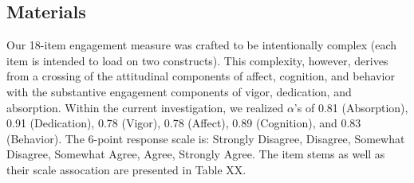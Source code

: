 \documentclass[
  english,
  man]{apa6}
\begin{document}
\hypertarget{materials}{%
\subsection{Materials}\label{materials}}

Our 18-item engagement measure was crafted to be intentionally complex (each item is intended to load on two constructs). This complexity, however, derives from a crossing of the attitudinal components of affect, cognition, and behavior with the substantive engagement components of vigor, dedication, and absorption. Within the current investigation, we realized \(\alpha\)'s of 0.81 (Absorption), 0.91 (Dedication), 0.78 (Vigor), 0.78 (Affect), 0.89 (Cognition), and 0.83 (Behavior). The 6-point response scale is: Strongly Disagree, Disagree, Somewhat Disagree, Somewhat Agree, Agree, Strongly Agree. The item stems as well as their scale assocation are presented in Table XX.
\end{document}
